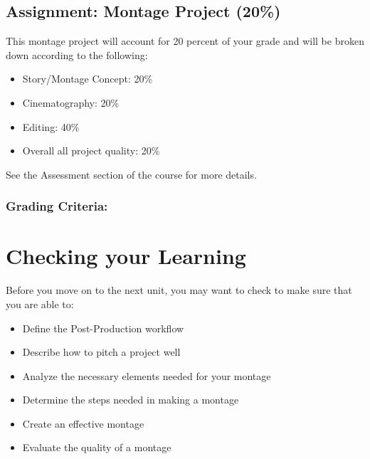 \documentclass[
]{book}
\providecommand{\tightlist}{%
  \setlength{\itemsep}{0pt}\setlength{\parskip}{0pt}}
\begin{document}
\begin{assessment}
\hypertarget{assignment-montage-project-20}{%
\subsection*{Assignment: Montage Project (20\%)}\label{assignment-montage-project-20}}

This montage project will account for 20 percent of your grade and will be broken down according to the following:

\begin{itemize}
\tightlist
\item
  Story/Montage Concept: 20\%\\
\item
  Cinematography: 20\%\\
\item
  Editing: 40\%\\
\item
  Overall all project quality: 20\%
\end{itemize}

See the Assessment section of the course for more details.

\hypertarget{grading-criteria}{%
\subsubsection*{Grading Criteria:}\label{grading-criteria}}
\end{assessment}

\hypertarget{checking-your-learning-6}{%
\section*{Checking your Learning}\label{checking-your-learning-6}}

\begin{progress}
Before you move on to the next unit, you may want to check to make sure that you are able to:

\begin{itemize}
\tightlist
\item
  Define the Post-Production workflow\\
\item
  Describe how to pitch a project well\\
\item
  Analyze the necessary elements needed for your montage\\
\item
  Determine the steps needed in making a montage\\
\item
  Create an effective montage\\
\item
  Evaluate the quality of a montage
\end{itemize}
\end{progress}
\end{document}
